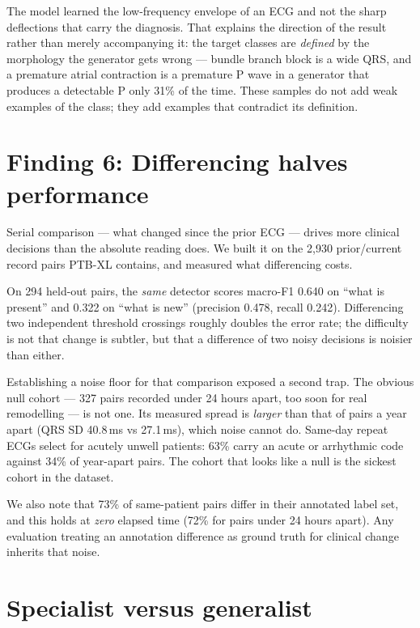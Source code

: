 \documentclass[pmlr,twocolumn,10pt]{jmlr}
\begin{document}
The model learned the low-frequency envelope of an ECG and not the sharp deflections that
carry the diagnosis. That explains the direction of the result rather than merely
accompanying it: the target classes are \emph{defined} by the morphology the generator gets
wrong --- bundle branch block is a wide QRS, and a premature atrial contraction is a
premature P wave in a generator that produces a detectable P only 31\% of the time. These
samples do not add weak examples of the class; they add examples that contradict its
definition.

\section{Finding 6: Differencing halves performance}
\label{sec:longitudinal}

Serial comparison --- what changed since the prior ECG --- drives more clinical decisions
than the absolute reading does. We built it on the 2{,}930 prior/current record pairs PTB-XL
contains, and measured what differencing costs.

On 294 held-out pairs, the \emph{same} detector scores macro-F1 0.640 on ``what is present''
and 0.322 on ``what is new'' (precision 0.478, recall 0.242). Differencing two independent
threshold crossings roughly doubles the error rate; the difficulty is not that change is
subtler, but that a difference of two noisy decisions is noisier than either.

Establishing a noise floor for that comparison exposed a second trap. The obvious null
cohort --- 327 pairs recorded under 24 hours apart, too soon for real remodelling --- is not
one. Its measured spread is \emph{larger} than that of pairs a year apart (QRS SD 40.8\,ms
vs 27.1\,ms), which noise cannot do. Same-day repeat ECGs select for acutely unwell patients:
63\% carry an acute or arrhythmic code against 34\% of year-apart pairs. The cohort that
looks like a null is the sickest cohort in the dataset.

We also note that 73\% of same-patient pairs differ in their annotated label set, and this
holds at \emph{zero} elapsed time (72\% for pairs under 24 hours apart). Any evaluation
treating an annotation difference as ground truth for clinical change inherits that noise.

\section{Specialist versus generalist}
\label{sec:benchmark}
\end{document}
